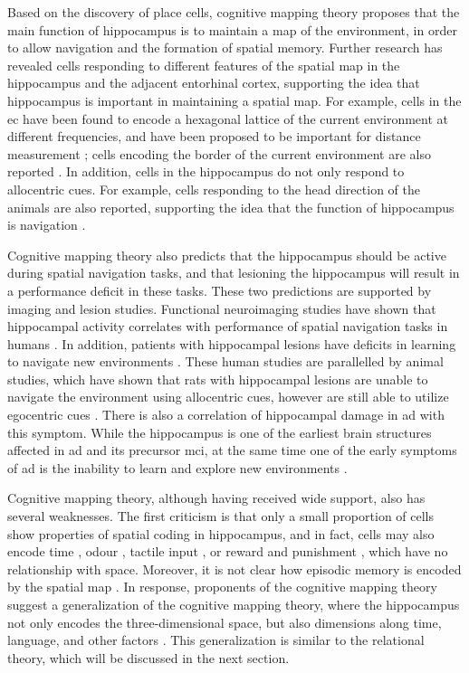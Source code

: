 Based on the discovery of place cells, cognitive mapping theory proposes that the main function of hippocampus is to maintain a map of the environment, in order to allow navigation and the formation of spatial memory. Further research has revealed cells responding to different features of the spatial map in the hippocampus and the adjacent entorhinal cortex, supporting the idea that hippocampus is important in maintaining a spatial map. For example, cells in the \gls{ec} have been found to encode a hexagonal lattice of the current environment at different frequencies, and have been proposed to be important for distance measurement \citep{fyhn04, hafting05, moser15}; cells encoding the border of the current environment are also reported \citep{solstad08}. In addition, cells in the hippocampus do not only respond to allocentric cues. For example, cells responding to the head direction of the animals are also reported, supporting the idea that the function of hippocampus is navigation \citep{sargolini06}. 

Cognitive mapping theory also predicts that the hippocampus should be active during spatial navigation tasks, and that lesioning the hippocampus will result in a performance deficit in these tasks. These two predictions are supported by imaging and lesion studies. Functional neuroimaging studies have shown that hippocampal activity correlates with performance of spatial navigation tasks in humans \citep{burgess02, hartley07}. In addition, patients with hippocampal lesions have deficits in learning to navigate new environments \citep{hartley07}. These human studies are parallelled by animal studies, which have shown that rats with hippocampal lesions are unable to navigate the environment using allocentric cues, however are still able to utilize egocentric cues \citep{morris06}. There is also a correlation of hippocampal damage in \gls{ad} with this symptom. While the hippocampus is one of the earliest brain structures affected in  \gls{ad} and its precursor \gls{mci}, at the same time one of the early symptoms of \gls{ad} is the inability to learn and explore new environments \citep{vlcek14}.

Cognitive mapping theory, although having received wide support, also has several weaknesses. The first criticism is that only a small proportion of cells show properties of spatial coding in hippocampus, and in fact, cells may also encode time \citep{hampson93}, odour \citep{wood99}, tactile input \citep{young94}, or reward and punishment \citep{moser08}, which have no relationship with space. Moreover, it is not clear how episodic memory is encoded by the spatial map \citep{konkel09}. In response, proponents of the cognitive mapping theory suggest a generalization of the cognitive mapping theory, where the hippocampus not only encodes the three-dimensional space, but also dimensions along time, language, and other factors \citep{burgess02}. This generalization is similar to the relational theory, which will be discussed in the next section.


